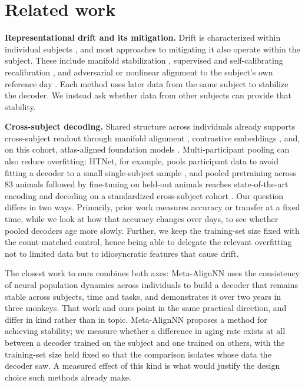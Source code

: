 \documentclass{article}
\begin{document}
\section{Related work}
\textbf{Representational drift and its mitigation.} Drift is characterized within individual
subjects \citep{rule2020,driscoll2017,schoonover2021,rule2019}, and most approaches to mitigating it
also operate within the subject. These include manifold stabilization \citep{degenhart2020},
supervised and self-calibrating recalibration \citep{jarosiewicz2015,wilson2025}, and adversarial or
nonlinear alignment to the subject's own reference day \citep{farshchian2019,karpowicz2025}. Each
method uses later data from the same subject to stabilize the decoder. We instead ask whether data
from other subjects can provide that stability.

\textbf{Cross-subject decoding.} Shared structure across individuals already supports cross-subject
readout through manifold alignment \citep{melbaum2022}, contrastive embeddings \citep{schneider2023},
and, on this cohort, atlas-aligned foundation models \citep{wicat2026}. Multi-participant pooling can
also reduce overfitting: HTNet, for example, pools participant data to avoid fitting a decoder to a
small single-subject sample \citep{peterson2021}, and pooled pretraining across 83 animals followed
by fine-tuning on held-out animals reaches state-of-the-art encoding and decoding on a standardized
cross-subject cohort \citep{neds2025}. Our question differs in two ways. Primarily, prior work
measures accuracy or transfer at a fixed time, while we look at how that accuracy changes over days,
to see whether pooled decoders age more slowly. Further, we keep the training-set size fixed with the
count-matched control, hence being able to delegate the relevant overfitting not to limited data but
to idiosyncratic features that cause drift.

The closest work to ours combines both axes: Meta-AlignNN \citep{metaalign2025} uses the consistency
of neural population dynamics across individuals to build a decoder that remains stable across
subjects, time and tasks, and demonstrates it over two years in three monkeys. That work and ours
point in the same practical direction, and differ in kind rather than in topic. Meta-AlignNN proposes
a method for achieving stability; we measure whether a difference in aging rate exists at all between
a decoder trained on the subject and one trained on others, with the training-set size held fixed so
that the comparison isolates whose data the decoder saw. A measured effect of this kind is what would
justify the design choice such methods already make.
\end{document}
